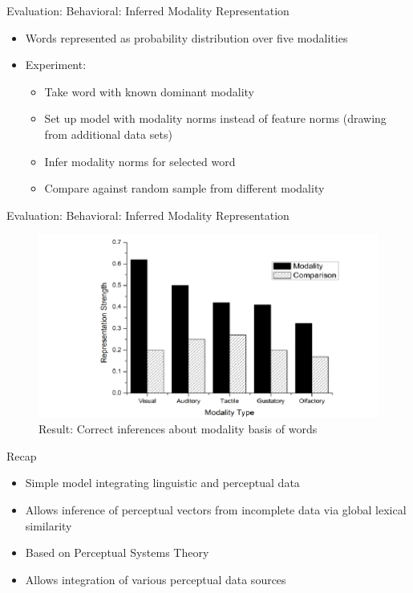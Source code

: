 \documentclass[12pt,a4paper]{beamer}
\begin{document}
\begin{frame}{Evaluation: Behavioral: Inferred Modality Representation}
\begin{itemize}
\item Words represented as probability distribution over five modalities
\item Experiment:
    \begin{itemize}
    \item Take word with known dominant modality
    \item Set up model with modality norms instead of feature norms (drawing from additional data sets)
    \item Infer modality norms for selected word
    \item Compare against random sample from different modality
    \end{itemize}
\end{itemize}
\end{frame}

\begin{frame}{Evaluation: Behavioral: Inferred Modality Representation}
\begin{figure}
\includegraphics[scale=0.7]{figure_5_level_of_strength_for_different_modalities.png}
\caption{Result: Correct inferences about modality basis of words}
\end{figure}
\end{frame}



\begin{frame}{Recap}
\begin{itemize}
\item Simple model integrating linguistic and perceptual data
\item Allows inference of perceptual vectors from incomplete data via global lexical similarity
\item Based on Perceptual Systems Theory
\item Allows integration of various perceptual data sources
\end{itemize}
\end{frame}
\end{document}
